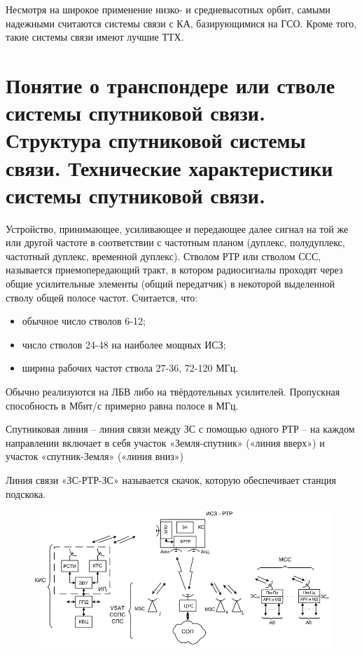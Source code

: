 \documentclass[14pt,a4paper,oneside]{extarticle}
\begin{document}
Несмотря на широкое применение низко- и средневысотных орбит, самыми надежными считаются системы связи с КА, базирующимися на ГСО. Кроме того, такие системы связи имеют лучшие ТТХ.

\section{Понятие о транспондере или стволе системы спутниковой связи. Структура спутниковой системы связи. Технические характеристики системы спутниковой связи.}

Устройство, принимающее, усиливающее и передающее далее сигнал на той же или другой частоте в соответствии с частотным планом (дуплекс, полудуплекс, частотный дуплекс, временной дуплекс). Стволом РТР или стволом ССС, называется приемопередающий тракт, в котором радиосигналы проходят через общие усилительные элементы (общий передатчик) в некоторой выделенной стволу общей полосе частот. Считается, что:
\begin{itemize}
    \item обычное число стволов 6-12;
    \item число стволов 24-48 на наиболее мощных ИСЗ;
    \item ширина рабочих частот ствола 27-36, 72-120 МГц.
\end{itemize}

Обычно реализуются на ЛБВ либо на твёрдотельных усилителей. Пропускная способность в Мбит/с примерно равна полосе в МГц.

Спутниковая линия – линия связи между ЗС с помощью одного РТР – на каждом направлении включает в себя участок «Земля-спутник» («линия вверх») и участок «спутник-Земля» («линия вниз»)

Линия связи «ЗС-РТР-ЗС» называется скачок, которую обеспечивает станция подскока.

\begin{figure}[H]
    \begin{center}
        \includegraphics[width=\textwidth]{imgs/3}
    \end{center}
\end{figure}
\end{document}
